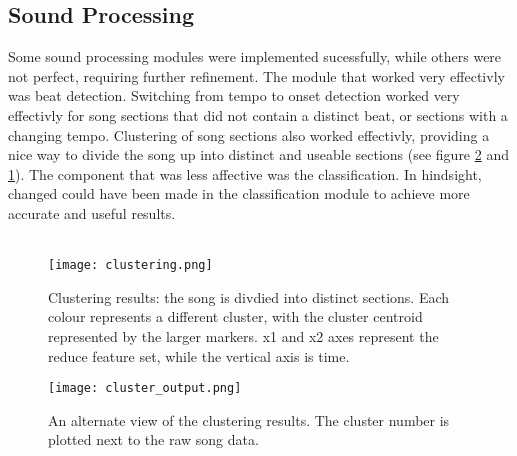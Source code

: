 \subsection{Sound Processing}



Some sound processing modules were implemented sucessfully, while others were not perfect, requiring further refinement. The module that worked very effectivly was beat detection. Switching from tempo to onset detection worked very effectivly for song sections that did not contain a distinct beat, or sections with a changing tempo. Clustering of song sections also worked effectivly, providing a nice way to divide the song up into distinct and useable sections (see figure \ref{fig:cluster_output} and \ref{fig:clustering}). The component that was less affective was the classification. In hindsight, changed could have been made in the classification module to achieve more accurate and useful results. \\
\\
\begin{figure}[H]
      \centering
      \texttt{[image: clustering.png]}
      \caption{Clustering results: the song is divdied into distinct sections. Each colour represents a different cluster, with the cluster centroid represented by the larger markers. x1 and x2 axes represent the reduce feature set, while the vertical axis is time.}
      \label{fig:clustering}
\end{figure}
\begin{figure}[H]
      \centering
      \texttt{[image: cluster\_output.png]}
      \caption{An alternate view of the clustering results. The cluster number is plotted next to the raw song data.}
      \label{fig:cluster_output}
\end{figure}

